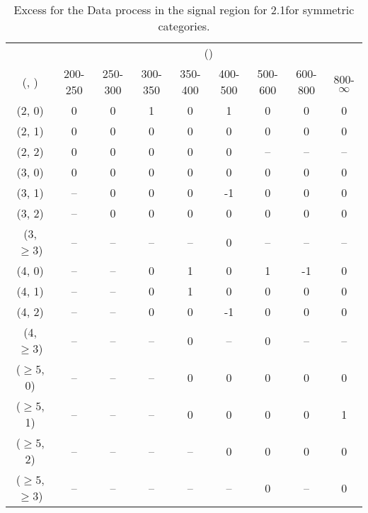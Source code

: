\begin{table}[h!]
\tiny
\centering
\caption{Excess for the Data process in the signal region for 2.1\ifb for symmetric categories.\label{tab:excesssep_sig_data_sym}}
\begin{tabular}
{ccccccccc}
	\hline\hline
	& \multicolumn{8}{c}{\scalht (\gev)} \\ 
	 (\njet,  \nb) & 200-250 & 250-300 & 300-350 & 350-400 & 400-500 & 500-600 & 600-800 & 800-$\infty$ \\ [0.8ex] 
\hline
	(2, 0) & 0 & 0 & 1 & 0 & 1 & 0 & 0 & 0 \\[0.5ex] 
	(2, 1) & 0 & 0 & 0 & 0 & 0 & 0 & 0 & 0 \\[0.5ex] 
	(2, 2) & 0 & 0 & 0 & 0 & 0 & -- & -- & -- \\[0.5ex] 
	(3, 0) & 0 & 0 & 0 & 0 & 0 & 0 & 0 & 0 \\[0.5ex] 
	(3, 1) & -- & 0 & 0 & 0 & -1 & 0 & 0 & 0 \\[0.5ex] 
	(3, 2) & -- & 0 & 0 & 0 & 0 & 0 & 0 & 0 \\[0.5ex] 
	(3, $\ge3$) & -- & -- & -- & -- & 0 & -- & -- & -- \\[0.5ex] 
	(4, 0) & -- & -- & 0 & 1 & 0 & 1 & -1 & 0 \\[0.5ex] 
	(4, 1) & -- & -- & 0 & 1 & 0 & 0 & 0 & 0 \\[0.5ex] 
	(4, 2) & -- & -- & 0 & 0 & -1 & 0 & 0 & 0 \\[0.5ex] 
	(4, $\ge3$) & -- & -- & -- & 0 & -- & 0 & -- & -- \\[0.5ex] 
	($\ge5$, 0) & -- & -- & -- & 0 & 0 & 0 & 0 & 0 \\[0.5ex] 
	($\ge5$, 1) & -- & -- & -- & 0 & 0 & 0 & 0 & 1 \\[0.5ex] 
	($\ge5$, 2) & -- & -- & -- & -- & 0 & 0 & 0 & 0 \\[0.5ex] 
	($\ge5$, $\ge3$) & -- & -- & -- & -- & -- & 0 & -- & 0 \\[0.5ex] 
	\hline
	\hline
\end{tabular}
\end{table}
